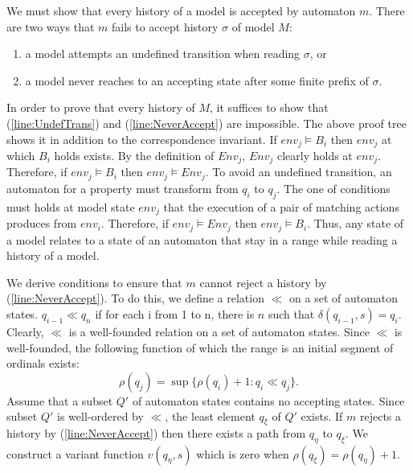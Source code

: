 \documentclass[12pt,a4paper,titlepage]{article}
\theoremstyle{break}
\begin{document}
We must show that every history of a model is accepted by automaton $m$.
There are two ways that $m$ fails to accept history \(\sigma\) of model \(M\):
  \begin{enumerate}
\renewcommand{\theenumi}{\roman{enumi}}
\renewcommand{\labelenumi}{(\roman{enumi})}
\item a model attempts an undefined transition when reading \(\sigma\), or \label{line:UndefTrans}
\item a model never reaches to an accepting state after some finite prefix of \(\sigma\). \label{line:NeverAccept}
  \end{enumerate}
In order to prove that every history of \(M\), it suffices to show that (\ref{line:UndefTrans}) and (\ref{line:NeverAccept}) are impossible.
The above proof tree shows it in addition to the correspondence invariant.
If \(env_j\models B_i\) then \(env_j\) at which \(B_i\) holds exists.
By the definition of \(Env_j\), \(Env_j\) clearly holds at \(env_j\).
Therefore, if \(env_j\models B_i\) then \(env_j\models Env_j\).
To avoid an undefined transition, an automaton for a property must transform from \(q_i\) to \(q_j\).
The one of conditions must holds at model state \(env_j\) that the execution of a pair of matching actions produces from \(env_i\).
Therefore, if \(env_j\models Env_j\) then \(env_j\models B_i\).
Thus, any state of a model relates to a state of an automaton that stay in a range while reading a history of a model.

We derive conditions to ensure that $m$ cannot reject a history by (\ref{line:NeverAccept}).
To do this, we define a relation $\ll$ on a set of automaton states.
\(q_{i-1}\ll q_n\) if for each i from 1 to n, there is $n$ such that \(\delta(q_{i-1},s)=q_{i}\).
Clearly, \(\ll\) is a well-founded relation on a set of automaton states.
Since \(\ll\) is well-founded, the following function of which the range is an initial segment of ordinals exists:
  \begin{displaymath}
\rho(q_j)=\sup\{\rho(q_i)+1\colon q_i\ll q_j\}.
  \end{displaymath}
Assume that a subset \(Q'\) of automaton states contains no accepting states.
Since subset \(Q'\) is well-ordered by \(\ll\), the least element \(q{_\xi}\) of \(Q'\) exists.
If $m$ rejects a history by (\ref{line:NeverAccept}) then there exists a path from \(q_{\eta}\) to \(q_{\xi}\).
We construct a variant function \(v(q_{\eta},s)\) which is zero when \(\rho(q_{\xi})=\rho(q_{\eta})+1\).
\end{document}
